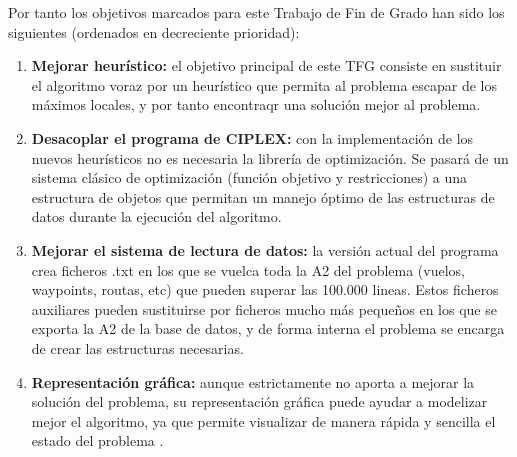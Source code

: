 Por tanto los objetivos marcados para este Trabajo de Fin de Grado han sido los siguientes (ordenados en decreciente prioridad):
\begin{enumerate}
	\item \textbf{Mejorar heurístico: }el objetivo principal de este TFG consiste en sustituir el algoritmo voraz por un heurístico que permita al problema escapar de los máximos locales, y por tanto encontraqr una solución mejor al problema.
	\item \textbf{Desacoplar el programa de CIPLEX: }con la implementación de los nuevos heurísticos no es necesaria la librería de optimización. Se pasará de un sistema clásico de optimización (función objetivo y restricciones) a una estructura de objetos que permitan un manejo óptimo de las estructuras de datos durante la ejecución del algoritmo.
	\item \textbf{Mejorar el sistema de lectura de datos: }la versión actual del programa crea ficheros .txt en los que se vuelca toda la A2 del problema (vuelos, waypoints, routas, etc) que pueden superar las 100.000 lineas. Estos ficheros auxiliares pueden sustituirse por ficheros mucho más pequeños en los que se exporta la A2 de la base de datos, y de forma interna el problema se encarga de crear las estructuras necesarias.
	\item \textbf{Representación gráfica: }aunque estrictamente no aporta a mejorar la solución del problema, su representación gráfica puede ayudar a modelizar mejor el algoritmo, ya que permite visualizar de manera rápida y sencilla el estado del problema .
\end{enumerate}